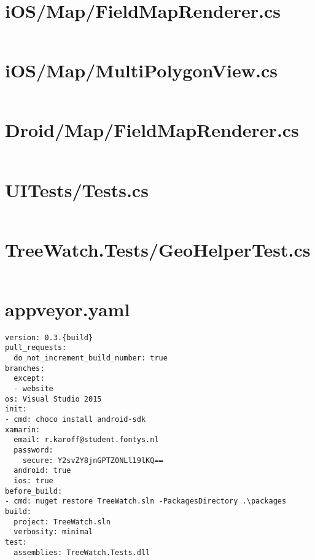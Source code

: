 \documentclass[12pt]{article}
\begin{document}
\section{iOS/Map/FieldMapRenderer.cs}
\inputminted[linenos,firstline=22]{csharp}{../../../src/iOS/Map/FieldMapRenderer.cs}


\section{iOS/Map/MultiPolygonView.cs}
\inputminted[linenos,firstline=22]{csharp}{../../../src/iOS/Map/MultiPolygonView.cs}

\section{Droid/Map/FieldMapRenderer.cs}
\inputminted[linenos,firstline=22]{csharp}{../../../src/Droid/Map/FieldMapRenderer.cs}

\section{UITests/Tests.cs}
\inputminted[linenos,firstline=22]{csharp}{../../../src/UITests/Tests.cs}

\section{TreeWatch.Tests/GeoHelperTest.cs}
\inputminted[linenos,firstline=22]{csharp}{../../../src/TreeWatch.Tests/GeoHelperTest.cs}

\section{appveyor.yaml}
\begin{verbatim}
version: 0.3.{build}
pull_requests:
  do_not_increment_build_number: true
branches:
  except:
  - website
os: Visual Studio 2015
init:
- cmd: choco install android-sdk
xamarin:
  email: r.karoff@student.fontys.nl
  password:
    secure: Y2svZY8jnGPTZ0NLl19lKQ==
  android: true
  ios: true
before_build:
- cmd: nuget restore TreeWatch.sln -PackagesDirectory .\packages
build:
  project: TreeWatch.sln
  verbosity: minimal
test:
  assemblies: TreeWatch.Tests.dll
\end{verbatim}
\end{document}
